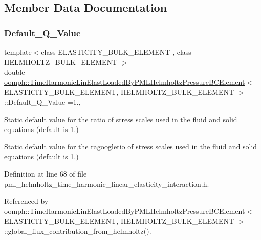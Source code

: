\subsection{Member Data Documentation}
\mbox{\label{classoomph_1_1TimeHarmonicLinElastLoadedByPMLHelmholtzPressureBCElement_a0f3bb2e8a6d9efe816f766b5e946f9c7}} 
\subsubsection{\texorpdfstring{Default\+\_\+\+Q\+\_\+\+Value}{Default\_Q\_Value}}
{\footnotesize\ttfamily template$<$class E\+L\+A\+S\+T\+I\+C\+I\+T\+Y\+\_\+\+B\+U\+L\+K\+\_\+\+E\+L\+E\+M\+E\+NT , class H\+E\+L\+M\+H\+O\+L\+T\+Z\+\_\+\+B\+U\+L\+K\+\_\+\+E\+L\+E\+M\+E\+NT $>$ \\
double \hyperlink{classoomph_1_1TimeHarmonicLinElastLoadedByPMLHelmholtzPressureBCElement}{oomph\+::\+Time\+Harmonic\+Lin\+Elast\+Loaded\+By\+P\+M\+L\+Helmholtz\+Pressure\+B\+C\+Element}$<$ E\+L\+A\+S\+T\+I\+C\+I\+T\+Y\+\_\+\+B\+U\+L\+K\+\_\+\+E\+L\+E\+M\+E\+NT, H\+E\+L\+M\+H\+O\+L\+T\+Z\+\_\+\+B\+U\+L\+K\+\_\+\+E\+L\+E\+M\+E\+NT $>$\+::Default\+\_\+\+Q\+\_\+\+Value =1.\hspace{0.3cm}{\ttfamily [static]}, {\ttfamily [protected]}}



Static default value for the ratio of stress scales used in the fluid and solid equations (default is 1.) 

Static default value for the ragoogletio of stress scales used in the fluid and solid equations (default is 1.) 

Definition at line 68 of file pml\+\_\+helmholtz\+\_\+time\+\_\+harmonic\+\_\+linear\+\_\+elasticity\+\_\+interaction.\+h.



Referenced by oomph\+::\+Time\+Harmonic\+Lin\+Elast\+Loaded\+By\+P\+M\+L\+Helmholtz\+Pressure\+B\+C\+Element$<$ E\+L\+A\+S\+T\+I\+C\+I\+T\+Y\+\_\+\+B\+U\+L\+K\+\_\+\+E\+L\+E\+M\+E\+N\+T, H\+E\+L\+M\+H\+O\+L\+T\+Z\+\_\+\+B\+U\+L\+K\+\_\+\+E\+L\+E\+M\+E\+N\+T $>$\+::global\+\_\+flux\+\_\+contribution\+\_\+from\+\_\+helmholtz().

